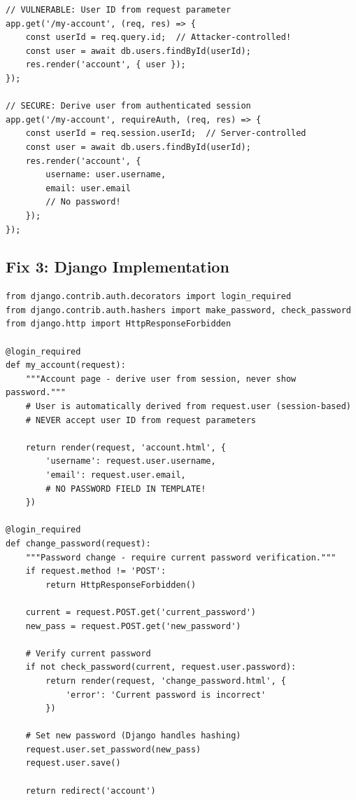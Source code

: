 \documentclass[11pt,letterpaper]{article}
\begin{document}
\begin{listing}[H]
\begin{verbatim}
// VULNERABLE: User ID from request parameter
app.get('/my-account', (req, res) => {
    const userId = req.query.id;  // Attacker-controlled!
    const user = await db.users.findById(userId);
    res.render('account', { user });
});

// SECURE: Derive user from authenticated session
app.get('/my-account', requireAuth, (req, res) => {
    const userId = req.session.userId;  // Server-controlled
    const user = await db.users.findById(userId);
    res.render('account', {
        username: user.username,
        email: user.email
        // No password!
    });
});
\end{verbatim}
\caption{Node.js: Derive user from session, not parameter}
\end{listing}

\subsection{Fix 3: Django Implementation}

\begin{listing}[H]
\begin{verbatim}
from django.contrib.auth.decorators import login_required
from django.contrib.auth.hashers import make_password, check_password
from django.http import HttpResponseForbidden

@login_required
def my_account(request):
    """Account page - derive user from session, never show password."""
    # User is automatically derived from request.user (session-based)
    # NEVER accept user ID from request parameters

    return render(request, 'account.html', {
        'username': request.user.username,
        'email': request.user.email,
        # NO PASSWORD FIELD IN TEMPLATE!
    })

@login_required
def change_password(request):
    """Password change - require current password verification."""
    if request.method != 'POST':
        return HttpResponseForbidden()

    current = request.POST.get('current_password')
    new_pass = request.POST.get('new_password')

    # Verify current password
    if not check_password(current, request.user.password):
        return render(request, 'change_password.html', {
            'error': 'Current password is incorrect'
        })

    # Set new password (Django handles hashing)
    request.user.set_password(new_pass)
    request.user.save()

    return redirect('account')
\end{verbatim}
\caption{Django: Secure account view}
\end{listing}
\end{document}
